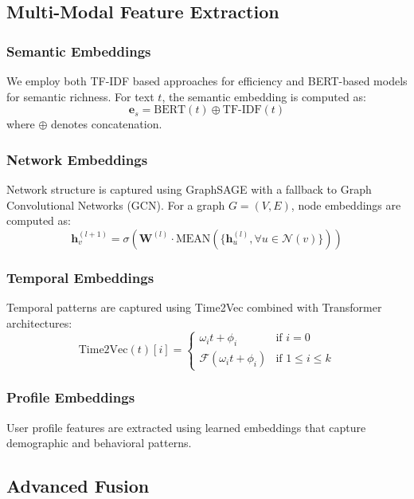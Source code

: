 \documentclass[conference]{IEEEtran}
\begin{document}
\subsection{Multi-Modal Feature Extraction}

\subsubsection{Semantic Embeddings}
We employ both TF-IDF based approaches for efficiency and BERT-based models for semantic richness. For text $t$, the semantic embedding is computed as:
\begin{equation}
\mathbf{e}_s = \text{BERT}(t) \oplus \text{TF-IDF}(t)
\end{equation}
where $\oplus$ denotes concatenation.

\subsubsection{Network Embeddings}
Network structure is captured using GraphSAGE with a fallback to Graph Convolutional Networks (GCN). For a graph $G = (V, E)$, node embeddings are computed as:
\begin{equation}
\mathbf{h}_v^{(l+1)} = \sigma\left(\mathbf{W}^{(l)} \cdot \text{MEAN}\left(\{\mathbf{h}_u^{(l)}, \forall u \in \mathcal{N}(v)\}\right)\right)
\end{equation}

\subsubsection{Temporal Embeddings}
Temporal patterns are captured using Time2Vec combined with Transformer architectures:
\begin{equation}
\text{Time2Vec}(t)[i] = \begin{cases}
\omega_i t + \phi_i & \text{if } i = 0 \\
\mathcal{F}(\omega_i t + \phi_i) & \text{if } 1 \leq i \leq k
\end{cases}
\end{equation}

\subsubsection{Profile Embeddings}
User profile features are extracted using learned embeddings that capture demographic and behavioral patterns.

\subsection{Advanced Fusion}
\end{document}
